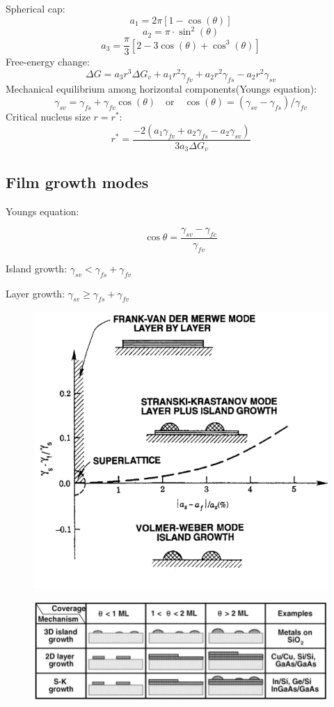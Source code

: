 Spherical cap:
\[
a_1 = 2\pi\left[1 -  \cos(\theta)\right]
\]
\[
a_2 = \pi\cdot\sin^2(\theta)
\]
\[
a_3 = \frac{\pi}{3}\left[2 - 3\cos(\theta) + \cos^3(\theta)\right]
\]
Free-energy change:
\[
\Delta G = a_3 r^3 \Delta G_v + a_1 r^2 \gamma_{fv} + a_2 r^2 \gamma_{fs} - a_2 r^2 \gamma_{sv}
\]
Mechanical equilibrium among horizontal components(Youngs equation):
\[
\gamma_{sv} = \gamma_{fs} + \gamma_{fv} \cos(\theta)\quad\text{or}\quad \cos(\theta) = (\gamma_{sv} -\gamma_{fs})/\gamma_{fv}
\]
Critical nucleus size \(r = r^*\):
\[
r^* = \frac{-2(a_1 \gamma_{fv}+a_2 \gamma_{fs} - a_2 \gamma_{sv})}{3 a_3 \Delta G_v}
\]
\subsection{Film growth modes}
Youngs equation:

\[
\cos \theta = \frac{\gamma_{sv} - \gamma_{fc}}{\gamma_{fv}}
\]

Island growth:
\(
 \gamma_{sv} < \gamma_{fs} + \gamma_{fv}
\)

Layer growth:
\(
\gamma_{sv} \ge \gamma_{fs} + \gamma_{fv}
\)
\begin{figure}[!ht]
    \centering
    \includegraphics[width=0.8\columnwidth]{images/layergrowth.png}
    \label{fig:layergrowth}
\end{figure}
\begin{figure}[!ht]
    \centering
    \includegraphics[width=\columnwidth]{images/growthmode2.png}
    \label{fig:growthmode2}
\end{figure}

